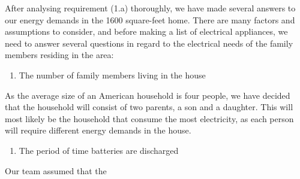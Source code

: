 After analysing requirement (1.a) thoroughly, we have made several answers to our energy demands in the 1600 square-feet home. There are many factors and assumptions to consider, and before making a list of electrical appliances, we need to answer several questions in regard to the electrical needs of the family members residing in the area:
\begin{enumerate}
    \item The number of family members living in the house
\end{enumerate}
As the average size of an American household is four people, we have decided that the household will consist of two parents, a son and a daughter. This will most likely be the household that consume the most electricity, as each person will require different energy demands in the house.
\begin{enumerate}[resume]
    \item The period of time batteries are discharged
\end{enumerate}
Our team assumed that the 